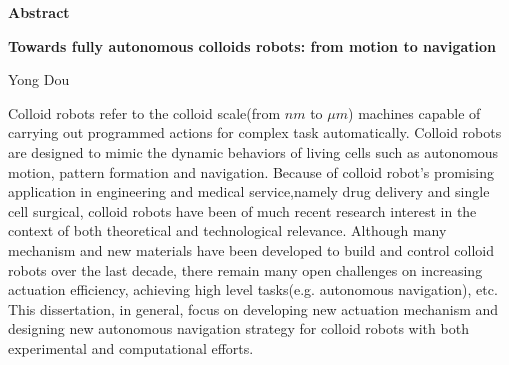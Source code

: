 
\begin{titlepage}
\begin{center}

\vspace*{1\baselineskip}
\textbf{\huge Abstract}

\textbf{Towards fully autonomous  colloids robots: from motion to navigation}

Yong Dou
\end{center}

\hspace{5mm}Colloid robots refer to the colloid scale(from $nm$ to $\mu m$) machines capable of carrying out programmed actions for complex task automatically.   Colloid robots are designed to mimic the dynamic behaviors of living cells such as autonomous motion, pattern formation and navigation. Because of colloid robot's promising application in engineering and medical service,namely drug delivery and single cell surgical, colloid robots have been of much recent research interest in the context of both theoretical and technological relevance. Although many mechanism and new materials have been developed to build and control colloid robots over the last decade, there remain many open challenges on increasing actuation efficiency, achieving high level tasks(e.g. autonomous navigation), etc. This dissertation, in general, focus on developing new actuation mechanism and designing new autonomous navigation strategy for colloid robots with both experimental and computational efforts.


\end{titlepage}
